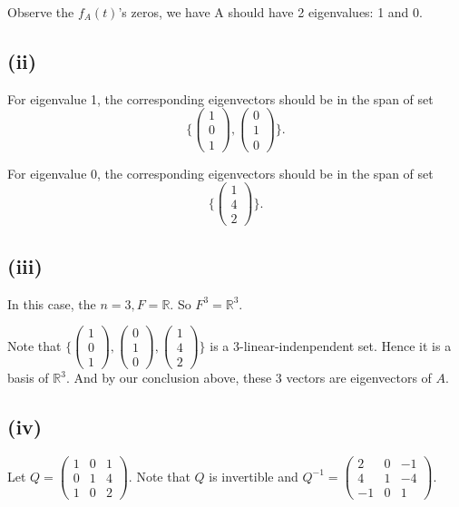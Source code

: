 \documentclass[12pt]{article}%
\begin{document}
Observe the $f_{A}(t)$'s zeros, we have A should have 2 eigenvalues: 1 and 0.

\subsection{(ii)}
For eigenvalue 1, the corresponding eigenvectors should be in the span of set $$\{\begin{pmatrix}1\\0\\1\end{pmatrix},\begin{pmatrix}0\\1\\0\end{pmatrix}\}.$$

For eigenvalue 0, the corresponding eigenvectors should be in the span of set $$\{\begin{pmatrix}1\\4\\2\end{pmatrix}\}.$$

\subsection{(iii)}
In this case, the $n=3, F = \mathbb{R}.$ So $F^3 = \mathbb{R}^3.$

Note that $\{ \begin{pmatrix}1\\0\\1\end{pmatrix}, \begin{pmatrix}0\\1\\0\end{pmatrix}, \begin{pmatrix}1\\4\\2\end{pmatrix}     \}$ is a 3-linear-indenpendent set. Hence it is a basis of $\mathbb{R}^3.$ And by our conclusion above, these 3 vectors are eigenvectors of $A$.

\subsection{(iv)}
Let $Q=\begin{pmatrix}1&0&1\\0&1&4\\1&0&2\end{pmatrix}$. Note that $Q$ is invertible and $Q^{-1}=\begin{pmatrix}2&0&-1\\4&1&-4\\-1&0&1\end{pmatrix}.$ 
\end{document}
